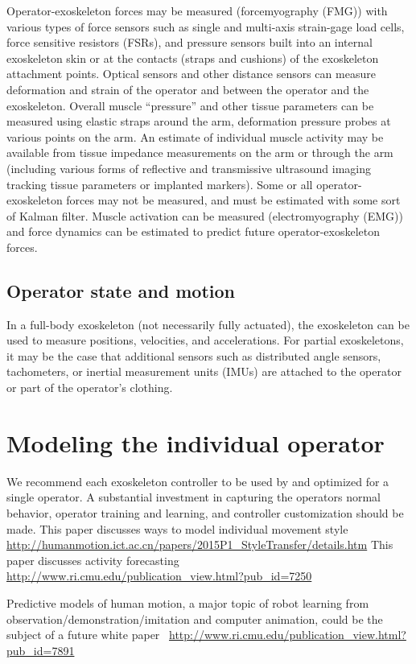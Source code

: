 \documentclass[letterpaper,12pt,fullpage]{article}
\begin{document}
Operator-exoskeleton forces may be measured (forcemyography (FMG))
with various types of
force sensors such as single and multi-axis strain-gage load cells,
force sensitive resistors (FSRs), and pressure sensors built into an internal exoskeleton skin or at the
contacts (straps and cushions) of the exoskeleton attachment points.
Optical sensors and other distance sensors can measure deformation and
strain of the operator and between the operator and the exoskeleton.
Overall muscle ``pressure'' and other tissue parameters can be measured using
elastic straps around the arm, deformation pressure probes at various
points on the arm.
An estimate of individual muscle activity
may be available from tissue impedance measurements on the arm
or through the arm (including various forms of reflective and transmissive
ultrasound imaging tracking tissue parameters or implanted markers).
Some or all operator-exoskeleton forces may not be measured, and must
be estimated with some sort of Kalman filter.
Muscle activation can be measured (electromyography (EMG))
and force dynamics can be estimated to predict future operator-exoskeleton
forces.

\subsection{Operator state and motion}

In a full-body exoskeleton
(not necessarily fully actuated), the
exoskeleton can be used to measure positions, velocities,
and accelerations. For partial exoskeletons,
it may be the case that additional sensors such as distributed 
angle sensors, tachometers, or inertial measurement units (IMUs)
are attached to the operator or part of the operator's clothing.

\section{Modeling the individual operator}

We recommend each exoskeleton controller
to be used by and optimized for a single operator.
A substantial investment in capturing the operators normal behavior,
operator training and learning, and controller customization should be made.
This paper discusses ways to model individual movement style
\url{http://humanmotion.ict.ac.cn/papers/2015P1_StyleTransfer/details.htm}
This paper discusses activity forecasting
\url{http://www.ri.cmu.edu/publication_view.html?pub_id=7250}

Predictive models of human motion, a major topic of robot learning from\\
observation/demonstration/imitation and computer animation,
could be the subject of a future white
paper~\cite{IEEE06913830}
\url{http://www.ri.cmu.edu/publication_view.html?pub_id=7891}
\end{document}
